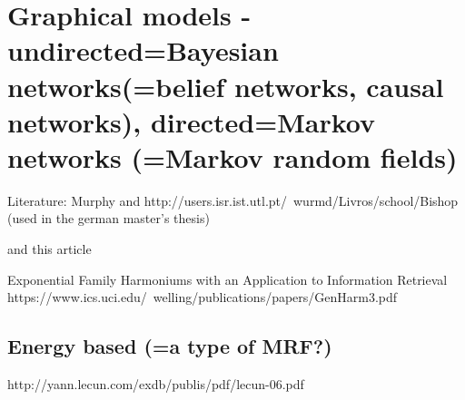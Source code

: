 \documentclass[twoside,english]{uiofysmaster}
\begin{document}
\section{Graphical models - undirected=Bayesian networks(=belief networks, causal networks), directed=Markov networks (=Markov random fields)}
Literature:
Murphy and
http://users.isr.ist.utl.pt/~wurmd/Livros/school/Bishop%
\cite{Bishop2006} (used in the german master's thesis)

and this article

Exponential Family Harmoniums
with an Application to Information Retrieval
https://www.ics.uci.edu/~welling/publications/papers/GenHarm3.pdf

\subsection{Energy based (=a type of MRF?)}

http://yann.lecun.com/exdb/publis/pdf/lecun-06.pdf
\end{document}
